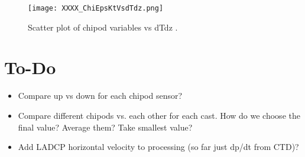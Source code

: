 \documentclass[11pt]{article}
\begin{document}
\begin{figure}[htbp]
\texttt{[image: XXXX\_ChiEpsKtVsdTdz.png]}
\caption{Scatter plot of chipod variables vs dTdz .}
\label{}
\end{figure}



\newpage
\clearpage
\newpage
\section{To-Do}

\begin{itemize}
\item Compare up vs down for each chipod sensor?
\item Compare different chipods vs. each other for each cast. How do we choose the final value? Average them? Take smallest value?
\item Add LADCP horizontal velocity to processing (so far just dp/dt from CTD)?
\end{itemize}


 

\end{document}
